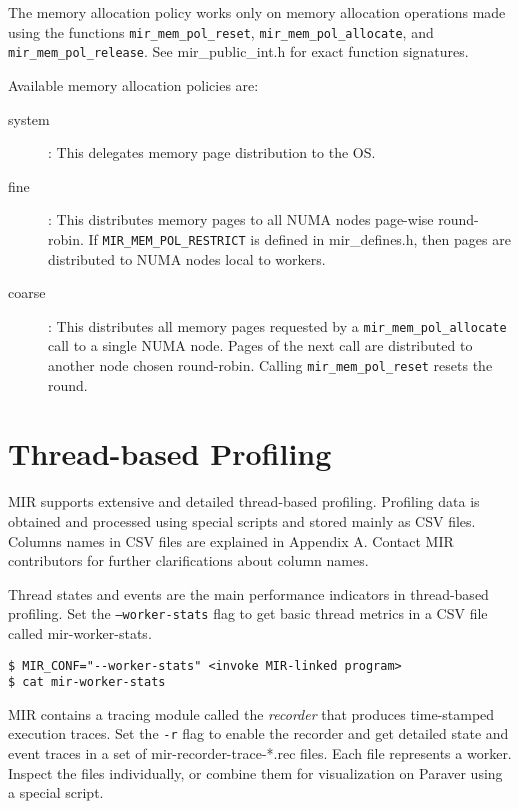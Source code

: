 \documentclass[11pt,a4paper]{article}
\begin{document}
The memory allocation policy works only on memory allocation operations made using the functions \texttt{mir\_mem\_pol\_reset}, \texttt{mir\_mem\_pol\_allocate}, and \texttt{mir\_mem\_pol\_release}. See \textsf{mir\_public\_int.h} for exact function signatures.

Available memory allocation policies are:
\begin{description}
    \item[system]: This delegates memory page distribution to the OS.
    \item[fine]: This distributes memory pages to all NUMA nodes page-wise round-robin. If \texttt{MIR\_MEM\_POL\_RESTRICT} is defined in \textsf{mir\_defines.h}, then pages are distributed to NUMA nodes local to workers.
    \item[coarse]: This distributes all memory pages requested by a \texttt{mir\_mem\_pol\_allocate} call to a single NUMA node. Pages of the next call are distributed to another node chosen round-robin. Calling \texttt{mir\_mem\_pol\_reset} resets the round.
\end{description}

\section{Thread-based Profiling}\label{sec:thread-based-profiling}

MIR supports extensive and detailed thread-based profiling. Profiling data is obtained and processed using special scripts and stored mainly as CSV files.
Columns names in CSV files are explained in Appendix A. Contact MIR contributors for further clarifications about column names.

Thread states and events are the main performance indicators in thread-based profiling.
Set the \texttt{--worker-stats} flag to get basic thread metrics in a CSV file called \textsf{mir-worker-stats}.

\begin{lstlisting}[style=MyInputStyle]
$ MIR_CONF="--worker-stats" <invoke MIR-linked program>
$ cat mir-worker-stats
\end{lstlisting}

MIR contains a tracing module called the \textit{recorder} that produces time-stamped execution traces. Set the \texttt{-r} flag to enable the recorder and get detailed state and event traces in a set of \textsf{mir-recorder-trace-*.rec} files.  Each file represents a worker. Inspect the files individually, or combine them for visualization on Paraver using a special script.
\end{document}
